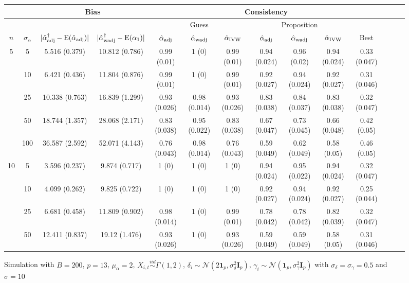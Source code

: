 \documentclass[10pt]{article}
\newcommand{\simiid}{\stackrel{iid}{\sim}} %
\def\normal#1#2{\mathcal{N}(#1,#2)} %
\def\E#1{\mathrm{E}(#1)} %
\theoremstyle{definition}
\begin{document}
\begin{sidewaysfigure}
\centering
\caption{Simulation  with $B = 200$, $p = 13$, $\mu_{\alpha}=2$, $X_{i,t} \simiid \Gamma(1,2)$, $\delta_i \sim \normal{2\mathbf{1}_p}{\sigma^2_{\delta}\mathbf{I}_p}$, $\gamma_i \sim \normal{\mathbf{1}_p}{\sigma^2_{\gamma}\mathbf{I}_p}$ with $\sigma_{\delta}=\sigma_{\gamma}=0.5$ and $\sigma = 10$}
\begin{tabular}{cc|cc|ccc|ccc|ccc|c}
  & & \multicolumn{2}{c|}{Bias}  & \multicolumn{7}{c}{Consistency}  \\ 
  \hline 
   &  & & & \multicolumn{3}{|c|}{Guess} & \multicolumn{3}{|c|}{Proposition} & \\ 
 $n$   & $\sigma_{\alpha}$ & $|\hat{\alpha}_{\rm adj}^{\dagger}-\E{\hat{\alpha}_{\rm adj}}|$ & $|\hat{\alpha}_{\rm wadj}^{\dagger}-\E{\alpha_1}|$ & $\hat{\alpha}_{\rm adj}$  & $\hat{\alpha}_{\rm wadj}$ & $\hat{\alpha}_{\rm IVW}$ & $\hat{\alpha}_{\rm adj}$  & $\hat{\alpha}_{\rm wadj}$ & $\hat{\alpha}_{\rm IVW}$ &  Best \\[.3cm]  
  \hline
  \multirow{5}{*}{5} & 5  & 5.516 (0.379) & 10.812 (0.786) & 0.99 (0.01) & 1 (0) & 0.99 (0.01) & 0.94 (0.024) & 0.96 (0.02) & 0.94 (0.024) & 0.33 (0.047) \\ 
    & 10  & 6.421 (0.436) & 11.804 (0.876) & 0.99 (0.01) & 1 (0) & 0.99 (0.01) & 0.92 (0.027) & 0.94 (0.024) & 0.92 (0.027) & 0.31 (0.046) \\ 
    & 25  & 10.338 (0.763) & 16.839 (1.299) & 0.93 (0.026) & 0.98 (0.014) & 0.93 (0.026) & 0.83 (0.038) & 0.84 (0.037) & 0.83 (0.038) & 0.32 (0.047) \\ 
  & 50  & 18.744 (1.357) & 28.068 (2.171) & 0.83 (0.038) & 0.95 (0.022) & 0.83 (0.038) & 0.67 (0.047) & 0.73 (0.045) & 0.66 (0.048) & 0.42 (0.05) \\ 
    & 100  & 36.587 (2.592) & 52.071 (4.143) & 0.76 (0.043) & 0.98 (0.014) & 0.76 (0.043) & 0.59 (0.049) & 0.62 (0.049) & 0.58 (0.05) & 0.46 (0.05)  \\[.3cm] 
    \multirow{5}{*}{10} & 5  & 3.596 (0.237) & 9.874 (0.717) & 1 (0) & 1 (0) & 1 (0) & 0.94 (0.024) & 0.95 (0.022) & 0.94 (0.024) & 0.32 (0.047) \\ 
    & 10  & 4.099 (0.262) & 9.825 (0.722) & 1 (0) & 1 (0) & 1 (0) & 0.92 (0.027) & 0.94 (0.024) & 0.92 (0.027) & 0.25 (0.044) \\ 
    & 25  & 6.681 (0.458) & 11.809 (0.902) & 0.98 (0.014) & 1 (0) & 0.99 (0.01) & 0.78 (0.042) & 0.78 (0.042) & 0.82 (0.039) & 0.32 (0.047) \\ 
    & 50  & 12.411 (0.837) & 19.12 (1.476) & 0.93 (0.026) & 1 (0) & 0.93 (0.026) & 0.59 (0.049) & 0.59 (0.049) & 0.58 (0.05) & 0.31 (0.046) \\ 

\end{tabular}
\end{sidewaysfigure}
\end{document}
